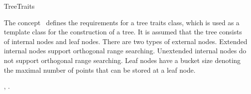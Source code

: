 

\begin{ccRefConcept}{TreeTraits}

\ccDefinition
  
The concept \ccRefName\ defines the requirements for a tree traits class, which is used as
a template class for the construction of a tree. 
It is assumed that the tree consists of internal nodes
and leaf nodes. There are two types of external nodes. Extended internal nodes support orthogonal range searching.
Unextended internal nodes do not support orthogonal range searching.
Leaf nodes have a bucket size denoting the maximal number of points that can be 
stored at a leaf node.

\ccTypes


\ccCreation
{}  %


\ccHasModels


\ccSeeAlso

,
.

\end{ccRefConcept}



